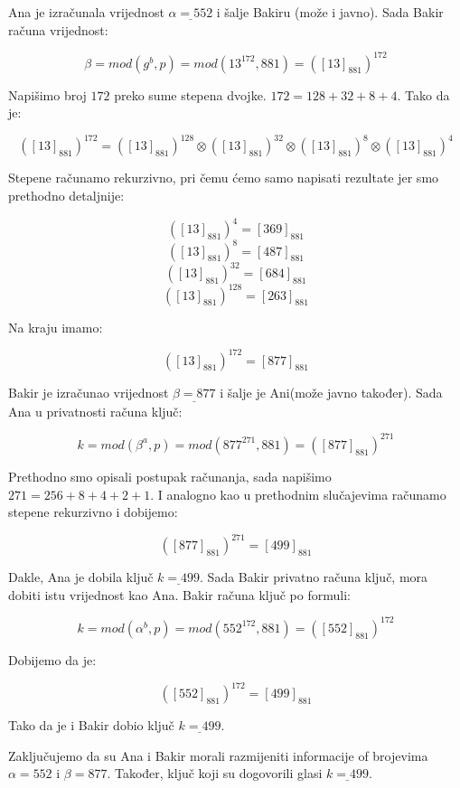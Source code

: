 \documentclass[12pt]{article}
\begin{document}
Ana je izračunala vrijednost $\underline{\alpha = 552}$ i šalje Bakiru (može i javno). Sada Bakir računa vrijednost: 

$$\beta = mod(g^b, p) = mod(13^{172}, 881) = ([13]_{881})^{172}$$\vspace{1mm}

Napišimo broj $172$ preko sume stepena dvojke. $172 = 128 + 32 + 8 + 4$. Tako da je:

$$([13]_{881})^{172} = ([13]_{881})^{128} \otimes ([13]_{881})^{32} \otimes ([13]_{881})^{8} \otimes ([13]_{881})^{4}$$\vspace{1mm}

Stepene računamo rekurzivno, pri čemu ćemo samo napisati rezultate jer smo prethodno detaljnije:

$$([13]_{881})^{4} = [369]_{881}$$
$$([13]_{881})^{8} = [487]_{881}$$
$$([13]_{881})^{32} = [684]_{881}$$
$$([13]_{881})^{128} = [263]_{881}$$\vspace{1mm}

Na kraju imamo:

$$([13]_{881})^{172} = [877]_{881}$$\vspace{1mm}

Bakir je izračunao vrijednost $\underline{\beta = 877}$ i šalje je Ani(može javno također). Sada Ana u privatnosti računa ključ:

$$k = mod(\beta^{a}, p) = mod(877^{271}, 881) = ([877]_{881})^{271}$$\vspace{1mm}

Prethodno smo opisali postupak računanja, sada napišimo $271 = 256 + 8 + 4 + 2 + 1$. I analogno kao u prethodnim slučajevima računamo stepene rekurzivno i dobijemo:

$$([877]_{881})^{271} =  [499]_{881}$$\vspace{1mm}

Dakle, Ana je dobila ključ $\underline{k = 499}$. Sada Bakir privatno računa ključ, mora dobiti istu vrijednost kao Ana. Bakir računa ključ po formuli:

$$k = mod(\alpha^{b}, p) = mod(552^{172}, 881) = ([552]_{881})^{172}$$\vspace{1mm}

Dobijemo da je:

$$([552]_{881})^{172} = [499]_{881}$$\vspace{1mm}

Tako da je i Bakir dobio ključ $\underline{k = 499}$. 

Zaključujemo da su Ana i Bakir morali razmijeniti informacije of brojevima $\alpha = 552$ i $\beta = 877$. Također, ključ koji su dogovorili glasi $\underline{k = 499}$.
\newpage
\end{document}
